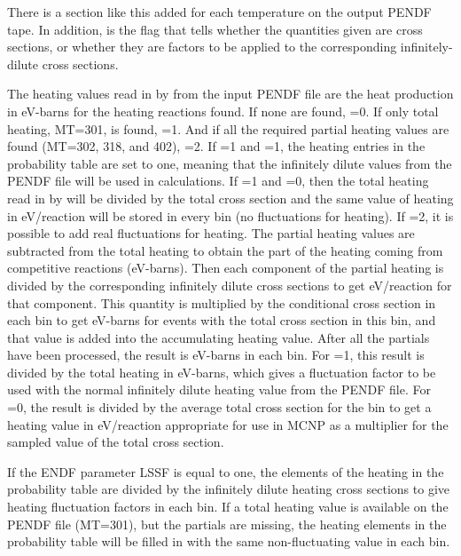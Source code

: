 \noindent
There is a section like this added for each temperature 
on the output PENDF tape.  In addition,  is the flag that
tells whether the quantities given are cross sections, or whether they
are factors to be applied to the corresponding infinitely-dilute cross
sections.

The heating values read in by  from the input PENDF file
are the heat production in eV-barns for the heating reactions found.
If none are found, =0.  If only total heating, MT=301,
is found, =1.  And if all the required partial heating
values are found (MT=302, 318, and 402), =2.  If
=1 and =1, the heating entries in the
probability table are set to one, meaning that the infinitely
dilute values from the PENDF file will be used in calculations.  If
=1 and =0, then the total heating read in
by  will be divided by the total cross section and
the same value of heating in eV/reaction will be stored in every
bin (no fluctuations for heating).  If =2, it is possible
to add real fluctuations for heating.  The partial heating values
are subtracted from the total heating to obtain the part of the
heating coming from competitive reactions (eV-barns).  Then each
component of the partial heating is divided by the corresponding
infinitely dilute cross sections to get eV/reaction for that
component.  This quantity is multiplied by the conditional cross
section in each bin to get eV-barns for events with the total cross
section in this bin, and that value is added into the accumulating
heating value.  After all the partials have been processed, the
result is eV-barns in each bin.  For =1, this result
is divided by the total heating in eV-barns, which gives a fluctuation
factor to be used with the normal infinitely dilute heating value from
the PENDF file.  For =0, the result is divided by the
average total cross section for the bin to get a heating value in
eV/reaction appropriate for use in MCNP as a multiplier for the
sampled value of the total cross section.

If the ENDF parameter LSSF is equal to one, the elements of the
heating in the probability table are divided by the infinitely dilute
heating cross sections to give heating fluctuation factors in each bin.
If a total heating value is available on the PENDF file (MT=301), but
the partials are missing, the heating elements in the probability
table will be filled in with the same non-fluctuating value in each bin.

